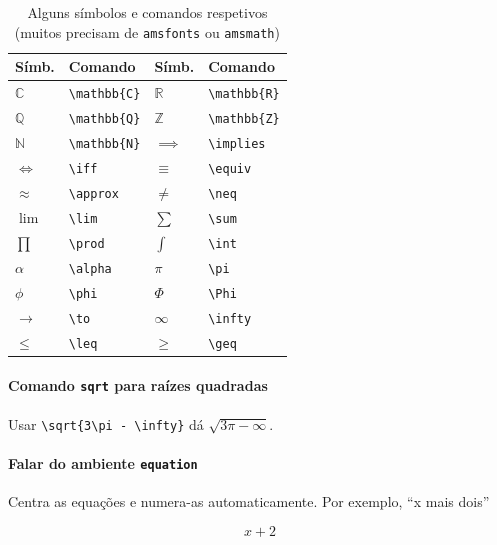 \documentclass[11pt]{article}
\begin{document}
\begin{table}[H]
    \centering
    \caption{Alguns símbolos e comandos respetivos (muitos precisam de
    \texttt{amsfonts} ou \texttt{amsmath})}
    \begin{tabular}{|l|l|l|l|} \hline
        \textbf{Símb.} & \textbf{Comando} &
        \textbf{Símb.} & \textbf{Comando} \\\hline
        $\mathbb{C}$ & \verb|\mathbb{C}| &
        $\mathbb{R}$ & \verb|\mathbb{R}| \\\hline
        $\mathbb{Q}$ & \verb|\mathbb{Q}| &
        $\mathbb{Z}$ & \verb|\mathbb{Z}| \\\hline
        $\mathbb{N}$ & \verb|\mathbb{N}| &
        $\implies$ & \verb|\implies| \\\hline
        $\iff$ & \verb|\iff| &
        $\equiv$ & \verb|\equiv| \\\hline
        $\approx$ & \verb|\approx| &
        $\neq$ & \verb|\neq| \\\hline
        $\lim$ & \verb|\lim| &
        $\sum$ & \verb|\sum| \\\hline
        $\prod$ & \verb|\prod| &
        $\int$ & \verb|\int| \\\hline
        $\alpha$ & \verb|\alpha| &
        $\pi$ & \verb|\pi| \\\hline
        $\phi$ & \verb|\phi| &
        $\Phi$ & \verb|\Phi| \\\hline
        $\to$ & \verb|\to| &
        $\infty$ & \verb|\infty| \\\hline
        $\leq$ & \verb|\leq| &
        $\geq$ & \verb|\geq| \\\hline
    \end{tabular}
\end{table}

\paragraph{Comando \texttt{sqrt} para raízes quadradas}
Usar \verb|\sqrt{3\pi - \infty}| dá $\sqrt{3\pi - \infty}$.

\paragraph{Falar do ambiente \texttt{equation}}
Centra as equações e numera-as automaticamente. Por exemplo, ``x mais dois''

\begin{equation}
    x + 2
\end{equation}
\end{document}
